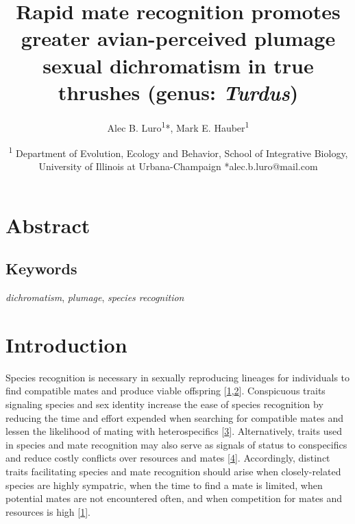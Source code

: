 \documentclass[
  a4paper,
]{article}
\title{Rapid mate recognition promotes greater avian-perceived plumage
sexual dichromatism in true thrushes (genus: \emph{Turdus})}
\author{Alec B. Luro\textsuperscript{1}*, Mark E.
Hauber\textsuperscript{1}}
\date{\textsuperscript{1} Department of Evolution, Ecology and Behavior,
School of Integrative Biology, University of Illinois at
Urbana-Champaign *alec.b.luro@mail.com}
\begin{document}
\maketitle

\hypertarget{abstract}{%
\section{Abstract}\label{abstract}}

\hypertarget{keywords}{%
\subsection{Keywords}\label{keywords}}

\emph{dichromatism}, \emph{plumage}, \emph{species recognition}

\hypertarget{introduction}{%
\section{Introduction}\label{introduction}}

Species recognition is necessary in sexually reproducing lineages for
individuals to find compatible mates and produce viable offspring
{[}\protect\hyperlink{ref-andersson1994}{1},\protect\hyperlink{ref-groning2008}{2}{]}.
Conspicuous traits signaling species and sex identity increase the ease
of species recognition by reducing the time and effort expended when
searching for compatible mates and lessen the likelihood of mating with
heterospecifics {[}\protect\hyperlink{ref-pfennig2012}{3}{]}.
Alternatively, traits used in species and mate recognition may also
serve as signals of status to conspecifics and reduce costly conflicts
over resources and mates
{[}\protect\hyperlink{ref-west-eberhard1983}{4}{]}. Accordingly,
distinct traits facilitating species and mate recognition should arise
when closely-related species are highly sympatric, when the time to find
a mate is limited, when potential mates are not encountered often, and
when competition for mates and resources is high
{[}\protect\hyperlink{ref-andersson1994}{1}{]}.
\end{document}
